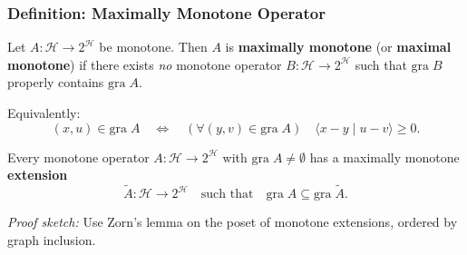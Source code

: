 \documentclass[aspectratio=169,10pt]{beamer}
\newcommand{\gra}{\mathrm{gra}\;}
\newcommand{\inprod}[2]{\langle #1 \mid #2 \rangle}
\newcommand{\Hilbert}{\mathcal{H}}
\begin{document}
\begin{frame}
    \frametitle{Definition: Maximally Monotone Operator}

    \begin{definition}[Definition 20.20]
        Let $A : \Hilbert \to 2^{\Hilbert}$ be monotone. Then $A$ is \textbf{maximally monotone}
        (or \textbf{maximal monotone}) if there exists \textit{no} monotone operator
        $B : \Hilbert \to 2^{\Hilbert}$ such that $\gra B$ properly contains $\gra A$.

        Equivalently:
        \[
            (x, u) \in \gra A \quad \Leftrightarrow \quad
            (\forall (y,v) \in \gra A) \quad \inprod{x - y}{u - v} \geq 0.
        \]
    \end{definition}

    \vspace{1.5em}

    \begin{theorem}
        Every monotone operator $A : \Hilbert \to 2^{\Hilbert}$ with $\gra A \neq \emptyset$
        has a maximally monotone \textbf{extension}
        \[
            \tilde{A} : \Hilbert \to 2^{\Hilbert} \quad \text{such that} \quad \gra A \subseteq \gra \tilde{A}.
        \]

        \textit{Proof sketch:} Use Zorn's lemma on the poset of monotone extensions, ordered by graph inclusion.
    \end{theorem}
\end{frame}
\end{document}

